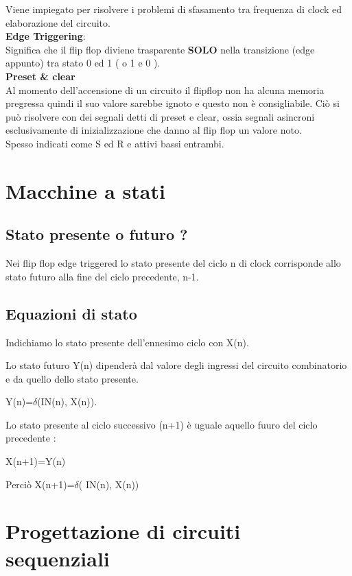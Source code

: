 \documentclass[a4paper]{book}
\begin{document}
Viene impiegato per risolvere i problemi di sfasamento tra frequenza di clock ed elaborazione del circuito.\vspace{\baselineskip}\\
\textbf{Edge Triggering}:\\
Significa che il flip flop diviene trasparente \textbf{SOLO} nella transizione (edge appunto) tra stato 0 ed 1 ( o 1 e 0 ).\vspace{\baselineskip}\\
\textbf{Preset \& clear}\\
Al momento dell'accensione di un circuito il flipflop non ha alcuna memoria pregressa quindi il suo valore sarebbe ignoto e questo non è consigliabile.
Ciò si può risolvere con dei segnali detti di preset e clear, ossia segnali asincroni esclusivamente di inizializzazione che danno al flip flop un valore noto.\\

Spesso indicati come S ed R e attivi bassi entrambi.


\section{Macchine a stati}

\subsection{Stato presente o futuro ?}
Nei flip flop edge triggered lo stato presente del ciclo n di clock corrisponde allo stato futuro alla fine del ciclo precedente, n-1.


\subsection{Equazioni di stato}

Indichiamo lo stato presente dell'ennesimo ciclo con X(n).

Lo stato futuro Y(n) dipenderà dal valore degli ingressi del circuito combinatorio e da quello dello stato presente.

Y(n)=\(\delta\)(IN(n), X(n)).

Lo stato presente al ciclo successivo (n+1) è uguale aquello fuuro del ciclo precedente :

X(n+1)=Y(n)

Perciò X(n+1)=\(\delta\)( IN(n), X(n))


\section{Progettazione di circuiti sequenziali}
\end{document}
